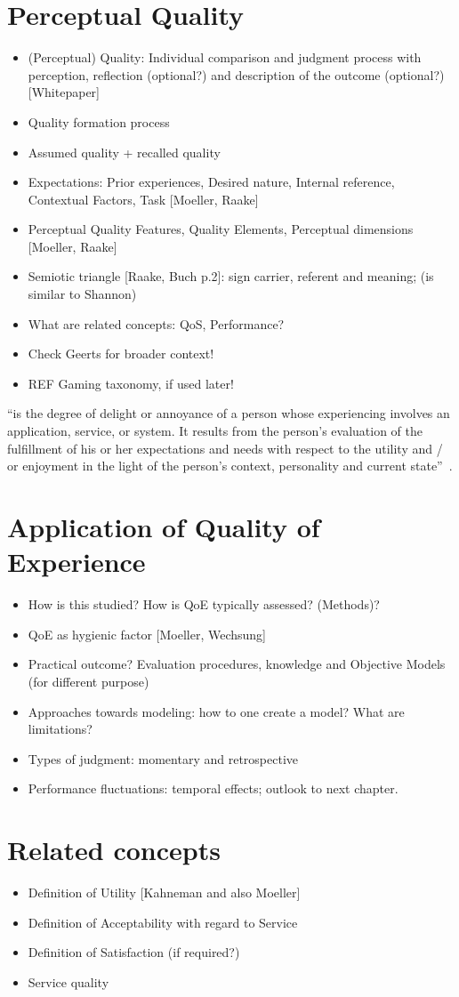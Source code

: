 \section{Perceptual Quality}
\begin{itemize}
\item (Perceptual) Quality: Individual comparison and judgment process with perception, reflection (optional?) and description of the outcome (optional?) [Whitepaper]
\item Quality formation process
\item Assumed quality + recalled quality
\item Expectations: Prior experiences, Desired nature, Internal reference, Contextual Factors, Task [Moeller, Raake]
\item Perceptual Quality Features, Quality Elements, Perceptual dimensions [Moeller, Raake]
\item Semiotic triangle [Raake, Buch p.2]: sign carrier, referent and meaning; (is similar to Shannon)
\item What are related concepts: QoS, Performance?

\item Check Geerts for broader context!
\item REF Gaming taxonomy, if used later!
\end{itemize}

\begin{definition}
``is the degree of delight or annoyance of a person whose experiencing involves an application, service, or system. It results from the person’s evaluation of the fulfillment of his or her expectations and needs with respect to the utility and / or enjoyment in the light of the person’s context, personality and current state''~\citep{moller_quality_2014}.
\end{definition}

\section{Application of Quality of Experience}
\begin{itemize}
\item How is this studied? How is QoE typically assessed? (Methods)? 
\item QoE as hygienic factor [Moeller, Wechsung]  
\item Practical outcome? Evaluation procedures, knowledge and Objective Models (for different purpose)

\item Approaches towards modeling: how to one create a model? What are limitations?
\item Types of judgment: momentary and retrospective
\item Performance fluctuations: temporal effects; outlook to next chapter.
\end{itemize}

\section{Related concepts}
\begin{itemize}
\item Definition of Utility [Kahneman and also Moeller]
\item Definition of Acceptability with regard to Service
\item Definition of Satisfaction (if required?)
\item Service quality
\end{itemize}